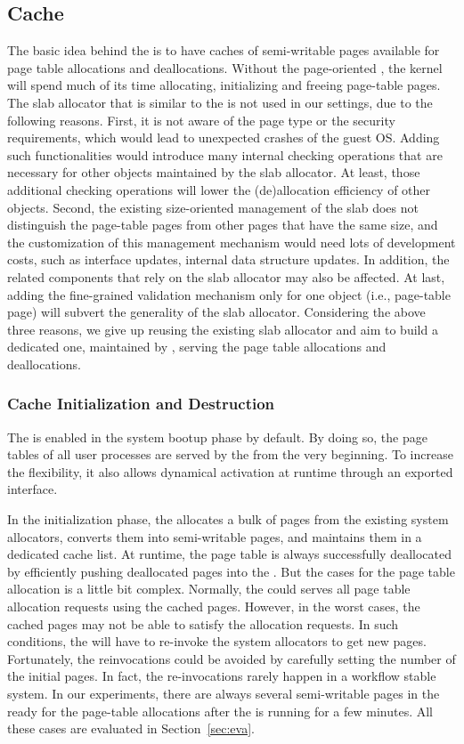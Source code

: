 \subsection{\name Cache}\label{sec:cache}
The basic idea behind the \cache is to have caches of semi-writable pages available for page table allocations and deallocations.
Without the page-oriented \cache, the kernel will spend much of its time allocating, initializing and freeing page-table pages.
The slab allocator that is similar to the \cache is not used in our settings, due to the following reasons.
First, it is not aware of the page type or the security requirements, which would lead to unexpected crashes of the guest OS.
Adding such functionalities would introduce many internal checking operations that are necessary for other objects maintained by the slab allocator.
At least, those additional checking operations will lower the (de)allocation efficiency of other objects.
Second, the existing size-oriented management of the slab does not distinguish the page-table pages from other pages that have the same size, and the customization of this management mechanism would need lots of development costs, such as interface updates, internal data structure updates.
In addition, the related components that rely on the slab allocator may also be affected.
At last, adding the fine-grained validation mechanism only for one object (i.e., page-table page) will subvert the generality of the slab allocator.
Considering the above three reasons, we give up reusing the existing slab allocator and aim to build a dedicated one, maintained by \cache, serving the page table allocations and deallocations.

\subsubsection{\name Cache Initialization and Destruction}
The \cache is enabled in the system bootup phase by default.
By doing so, the page tables of all user processes are served by the \cache from the very beginning.
To increase the flexibility, it also allows dynamical activation at runtime through an exported interface.

In the initialization phase, the \cache allocates a bulk of pages from the existing system allocators, converts them into semi-writable pages, and maintains them in a dedicated cache list.
At runtime, the page table is always successfully deallocated by efficiently pushing deallocated pages into the \cache.
But the cases for the page table allocation is a little bit complex.
Normally, the \cache could serves all page table allocation requests using the cached pages.
However, in the worst cases, the cached pages may not be able to satisfy the allocation requests.
In such conditions, the \cache will have to re-invoke the system allocators to get new pages.
Fortunately, the reinvocations could be avoided by carefully setting the number of the initial pages.
In fact, the re-invocations rarely happen in a workflow stable system.
In our experiments, there are always several  semi-writable pages in the \cache ready for the page-table allocations after the \name is running for a few minutes.
All these cases are evaluated in Section~\ref{sec:eva}.

